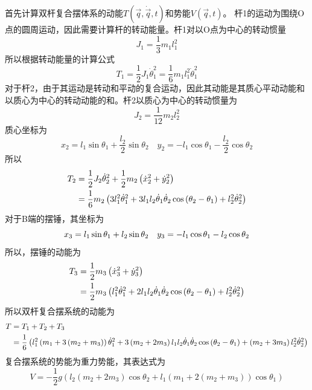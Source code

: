 \documentclass[a4paper,12pt,titlepage]{article}
\begin{document}
首先计算双杆复合摆体系的动能$T(\vec{q},\dot{\vec{q}},t) $和势能$V(\vec{q},t) $。
杆1的运动为围绕O点的圆周运动，因此需要计算杆的转动能量。杆1对以O点为中心的转动惯量
\begin{equation*}
	J_1=\frac{1}{3}m_1l_1^2
\end{equation*}
所以根据转动能量的计算公式
\begin{equation}
	T_{1}=\frac{1}{2}J_1\dot{\theta}_1^2=\frac{1}{6}m_1l_1^2\dot{\theta}_1^2
\end{equation}
对于杆2，由于其运动是转动和平动的复合运动，因此其动能是其质心平动动能和以质心为中心的转动动能的和。杆2以质心为中心的转动惯量为
\begin{equation*}
	J_2=\frac{1}{12}m_2l_2^2
\end{equation*}
质心坐标为
\begin{equation*}
	x_2=l_1\sin{\theta_1}+\frac{l_2}{2}\sin{\theta_2} \quad
	y_2=-l_1\cos{\theta_1}-\frac{l_2}{2}\cos{\theta_2} 
\end{equation*}
所以
\begin{align}
	T_{2}&=\frac{1}{2}J_2\dot{\theta}_2^2+\frac{1}{2}m_2\left(\dot{x}_2^2+\dot{y}_2^2\right) \notag\\
	&=\frac{1}{6}m_2\left(3l_1^2\dot{\theta}_1^2+3l_1l_2\dot{\theta}_1\dot{\theta}_2\cos{(\theta_2-\theta_1)}+l_2^2\dot{\theta}_2^2\right)
\end{align}
对于B端的摆锤，其坐标为
\begin{equation*}
	x_3=l_1\sin{\theta_1}+l_2\sin{\theta_2} \quad
	y_3=-l_1\cos{\theta_1}-l_2\cos{\theta_2} \notag
\end{equation*}
所以，摆锤的动能为
\begin{align}
	T_{3}&=\frac{1}{2}m_3\left(\dot{x}_3^2+\dot{y}_3^2 \right)\notag\\
	&=\frac{1}{2}m_3\left(l_1^2\dot{\theta}_1^2+2l_1l_2\dot{\theta}_1\dot{\theta}_2\cos{(\theta_2-\theta_1)}+l_2^2\dot{\theta}_2^2 \right)
\end{align}
所以双杆复合摆系统的动能为
\begin{align}
	T&=T_1+T_2+T_3 \notag\\
	&=\frac{1}{6}\left(l_1^2\left(m_1+3\left(m_2+m_3 \right) \right)\dot{\theta}_1^2+3\left(m_2+2m_3 \right)l_1l_2\dot{\theta}_1\dot{\theta}_2\cos{(\theta_2-\theta_1)}+\left(m_2+3m_3\right)l_2^2\dot{\theta}_2^2 \right)
\end{align}
复合摆系统的势能为重力势能，其表达式为
\begin{equation}
	V=-\frac{1}{2} g \left(l_2 \left(m_2+2 m_3\right) \cos{\theta_2}+l_1
   \left(m_1+2 \left(m_2+m_3\right)\right) \cos{\theta_1}\right)
\end{equation}
\end{document}
